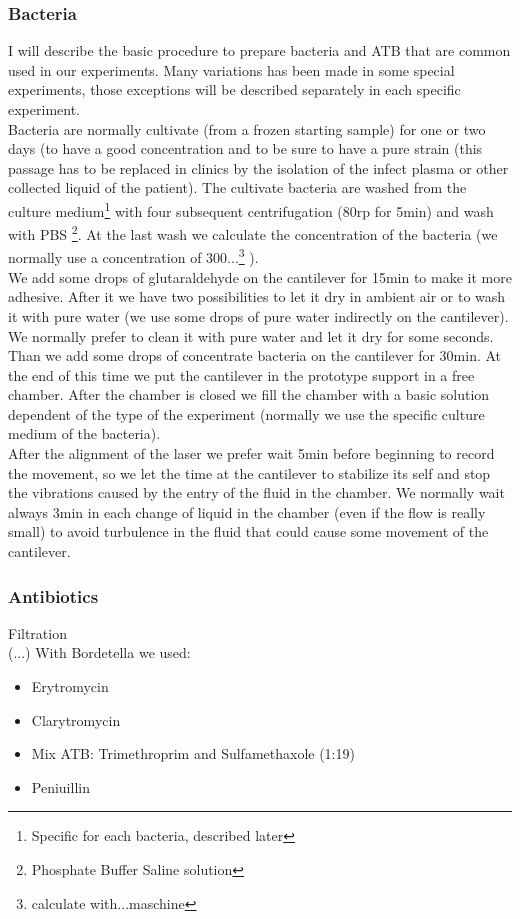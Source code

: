 \documentclass[11pt, a4paper]{article}
\begin{document}
\subsubsection{Bacteria} %
I will describe the basic procedure to prepare bacteria and ATB that are common used in our experiments. Many variations has been made in some special experiments, those exceptions will be described separately in each specific experiment. \\ Bacteria are normally cultivate (from a frozen starting sample) for one or two days (to have a good concentration and to be sure to have a pure strain (this passage has to be replaced in clinics by the isolation of the infect plasma or other collected liquid of the patient). The cultivate bacteria are washed from the culture medium\footnote{Specific for each bacteria, described later} with four subsequent centrifugation (80rp for 5min) and wash with PBS \footnote{Phosphate Buffer Saline solution}. At the last wash we calculate the concentration of the bacteria (we normally use a concentration of 300...\footnote{calculate with...maschine} ).
\\We add some drops of glutaraldehyde on the cantilever for 15min to make it more adhesive. After it we have two possibilities to let it dry in ambient air or to wash it with pure water (we use some drops of pure water indirectly on the cantilever). We normally prefer to clean it with pure water and let it dry for some seconds. 
Than we add some drops of concentrate bacteria on the cantilever for 30min.
At the end of this time we put the cantilever in the prototype support in a free chamber. After the chamber is closed we fill the chamber with a basic solution dependent of the type of the experiment (normally we use the specific culture medium of the bacteria).
\\After the alignment of the laser we prefer wait 5min before beginning to  record the movement, so we let the time at the cantilever to stabilize its self and stop the vibrations caused by the entry of the fluid in the chamber. We normally wait always 3min in each change of liquid in the chamber (even if the flow is really small) to avoid turbulence in the fluid that could cause some movement of the cantilever.

\subsubsection{Antibiotics} %
Filtration\\
(...) With Bordetella we used: 
\begin{itemize}
\item Erytromycin 
\item Clarytromycin 
\item Mix ATB: Trimethroprim and Sulfamethaxole (1:19)
\item Peniuillin
\end{itemize}
\end{document}
